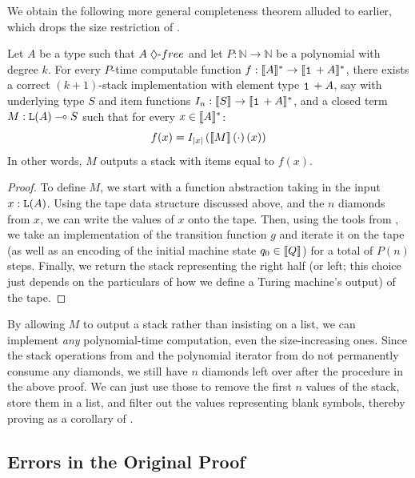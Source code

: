We obtain the following more general completeness theorem alluded to earlier, which
drops the size restriction of .
%
\begin{theorem}
\label{thm:completeness-general}
Let $A$ be a type such that $\dfree{A}$ and let $P : \mathbb N \to \mathbb N$ be a polynomial with degree $k$. For every $P$-time computable function $f : \tpsem{A}^* \to \tpsem{\tpsum{\tpunit{}}{A}}^*$, there exists a correct $(k+1)$-stack implementation with element type $\tpsum{\tpunit{}}{A}$, say with underlying type $S$ and item functions $I_n : \tpsem{S} \to \tpsem{\tpsum{\tpunit{}}{A}}^*$, and a closed term $M : \tparr{\tplist{A}}{S}$ such that for every $x \in \llbracket A \rrbracket^*$:
\[ f(x) = I_{|x|}\left({\llbracket M \rrbracket}\left(\cdot\right)(x)\right) \]
In other words, $M$ outputs a stack with items equal to $f(x)$.
\end{theorem}
\begin{proof}
To define $M$, we start with a function abstraction taking in the input $x : \tplist{A}$. Using the tape data structure discussed above, and the $n$ diamonds from $x$, we can write the values of $x$ onto the tape. Then, using the tools from , we take an \lfpl implementation of the transition function $g$ and iterate it on the tape (as well as an \lfpl encoding of the initial machine state $q_0 \in \llbracket Q \rrbracket$) for a total of $P(n)$ steps. Finally, we return the stack representing the right half (or left; this choice just depends on the particulars of how we define a Turing machine's output) of the tape.
\end{proof}

By allowing $M$ to output a stack rather than insisting on a list, we can implement \textit{any} polynomial-time computation, even the size-increasing ones. Since the stack operations from  and the polynomial iterator from  do not permanently consume any diamonds, we still have $n$ diamonds left over after the procedure in the above proof. We can just use those to remove the first $n$ values of the stack, store them in a list, and filter out the values representing blank symbols, thereby proving  as a corollary of .



\subsection{Errors in the Original Proof}
\label{sec:completeness-errors}

